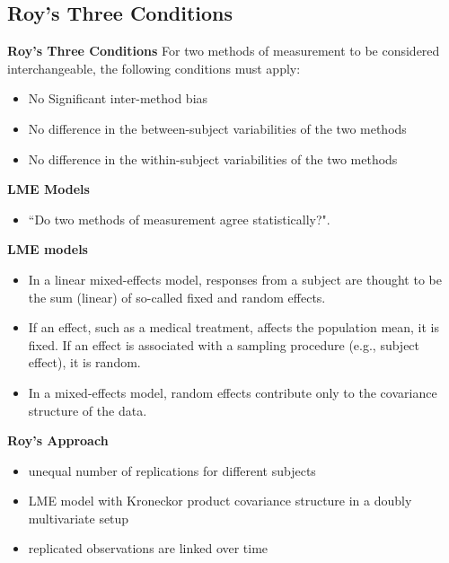 \documentclass[compress]{beamer}        %
\makeatletter
\newcommand{\tcb}{\textcolor{beamer@blendedblue}}
\makeatother
\begin{document}
\subsection{Roy's Three Conditions}
\begin{frame}{\bf \tcb{Roy's Three Conditions}}
For two methods of measurement to be considered interchangeable, the following conditions must apply:
\\
\begin{itemize}\itemsep0.5cm
\item No Significant inter-method bias
\item No difference in the between-subject variabilities of the two methods
\item No difference in the within-subject variabilities of the two methods
\end{itemize}
\end{frame}
\begin{frame}{\bf \tcb{LME Models}}
\begin{itemize}\itemsep0.7cm
\item ``Do two methods of measurement agree statistically?".
\end{itemize}
\end{frame}
\begin{frame}{\bf \tcb{LME models}}
\begin{itemize}\itemsep0.7cm
\item In a linear mixed-effects model, responses from a subject are thought to be the sum (linear) of so-called fixed and random
effects.
\item  If an effect, such as a medical treatment, affects the population mean, it is fixed. If an effect is associated with a
sampling procedure (e.g., subject effect), it is random.
\item In a mixed-effects model, random effects contribute only to the
covariance structure of the data.
\end{itemize}
\end{frame}
\begin{frame}{\bf \tcb{Roy's Approach}}
\begin{itemize}\itemsep0.7cm
\item unequal number of replications for different subjects
\item LME model with Kroneckor product covariance structure in a doubly multivariate setup
\item replicated observations are linked over time
\end{itemize}
\end{frame}
\end{document}
